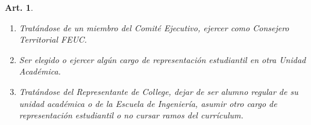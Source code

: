 \documentclass[letterpaper,11pt]{article}
\theoremstyle{plain}
\newtheorem{art}{Art.} %
\begin{document}
\begin{art}
\begin{enumerate}
					\begin{itemize}
						\item Directiva de la FEUC.
						\item Consejero Superior FEUC.
					\end{itemize}
				\item Tratándose de un miembro del Comité Ejecutivo, ejercer como \emph{Consejero Territorial FEUC}.
				\item Ser elegido o ejercer algún cargo de representación estudiantil en otra Unidad Académica.
				\item Tratándose del Representante de College, dejar de ser alumno regular de su unidad académica o de la Escuela de Ingeniería, asumir otro cargo de representación estudiantil o no cursar ramos del currículum.
			\end{enumerate}
		\end{art}
\end{document}
